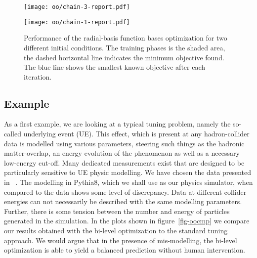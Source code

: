 \begin{figure}[h]
\centering
    \begin{minipage}{.48\textwidth}%
        \begin{center}
            \texttt{[image: oo/chain-3-report.pdf]}
        \end{center}
    \end{minipage}%
    \begin{minipage}{.04\textwidth}%
    \end{minipage}%
    \begin{minipage}{.48\textwidth}%
        \begin{center}
            \texttt{[image: oo/chain-1-report.pdf]}
        \end{center}
           
    \end{minipage}%
\caption{Performance of the radial-basis function bases optimization for two different initial conditions. The training phases is the shaded area, the dashed horizontal line indicates the minimum objective found. The blue line shows the smallest known objective after each iteration.}
\label{fig-ooevol}       %
\end{figure}


\subsection*{Example}

As a first example, we are looking at a typical tuning problem, namely the so-called underlying event (UE).
This effect, which is present at any hadron-collider data is modelled using various parameters, steering such things as the hadronic matter-overlap, an energy evolution of the phenomenon as well as a necessary low-energy cut-off. Many dedicated measurements exist that are designed to be particularly sensitive to UE physic modelling. We have chosen the data presented in ~\cite{Aad:2011qe}. The modelling in Pythia8, which we shall use as our physics simulator, when compared to the data shows some level of discrepancy. Data at different collider energies can not necessarily be described with the same modelling parameters. Further, there is some tension between the number and energy of particles generated in the simulation. In the plots shown in figure~\ref{fig-oocmp} we compare our results obtained with the bi-level optimization to the standard tuning approach. We would argue that in the presence of mis-modelling, the bi-level optimization is able to yield a balanced prediction without human intervention.

